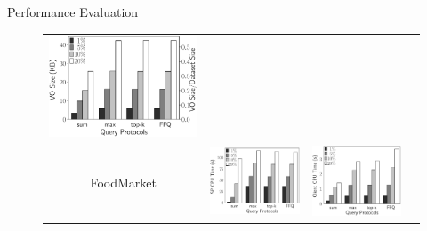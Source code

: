 \documentclass[xcolor={dvipsnames},aspectratio=169,10pt]{beamer}
\begin{document}
\begin{frame}{Performance Evaluation}
\begin{figure}
\begin{tabular}{c@{\quad}lll}
      \includegraphics[valign=m,totalheight=\ht\figbox]{exp-figs/aggregate-queries/pgp_vo.eps}
      \\
      FoodMarket &
      \includegraphics[valign=m,totalheight=\ht\figbox]{exp-figs/aggregate-queries/foodmarket_sp.eps} &
      \includegraphics[valign=m,totalheight=\ht\figbox]{exp-figs/aggregate-queries/foodmarket_client.eps} &

\end{tabular}
\end{figure}
\end{frame}
\end{document}

